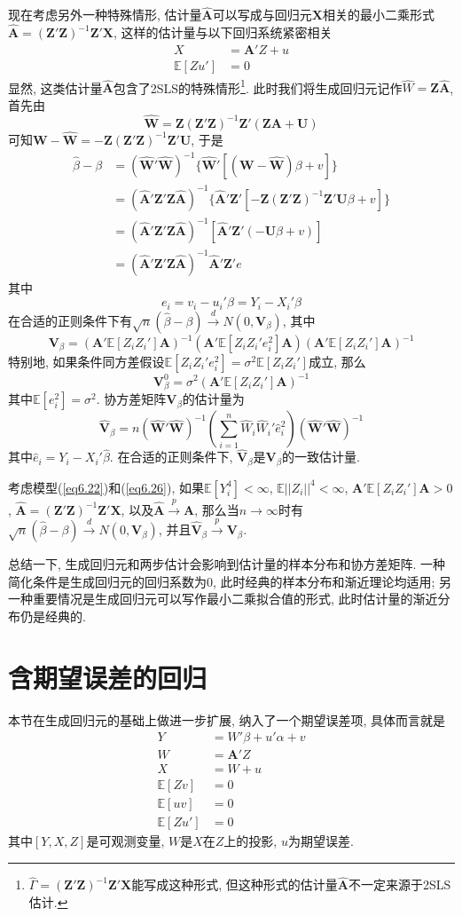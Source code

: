 \documentclass[cn, 12pt, math=mtpro2, bibstyle=apa, blue, twocol]{elegantbook}
\newcommand{\E}{\mathbb{E}}
\newcommand{\X}{\mathbold{X}}
\newcommand{\Z}{\mathbold{Z}}
\newcommand{\hb}{\hat{\beta}}
\newcommand{\V}{\mathbold{V}}
\newcommand{\A}{\mathbold{A}}
\begin{document}
现在考虑另外一种特殊情形, 估计量$\hat{\A}$可以写成与回归元$\X$相关的最小二乘形式$\hat{\A}=(\Z'\Z)^{-1}\Z'\X$, 这样的估计量与以下回归系统紧密相关
\begin{align}
  X&=\A'Z+u \label{eq6.26} \\
  \E[Zu']&=0 \nonumber
\end{align}
显然, 这类估计量$\hat{\A}$包含了2SLS的特殊情形\footnote{$\hat{\Gamma}=(\Z'\Z)^{-1}\Z'\X$能写成这种形式, 但这种形式的估计量$\hat{\A}$不一定来源于2SLS估计.}. 此时我们将生成回归元记作$\hat{W}=\Z\hat{\A}$, 首先由
$$\hat{\mathbold{W}}=\Z(\Z'\Z)^{-1}\Z'(\Z\A+\mathbold{U})$$
可知$\mathbold{W}-\hat{\mathbold{W}}=-\Z(\Z'\Z)^{-1}\Z'\mathbold{U}$, 于是
\begin{align*}
\hb-\beta&=(\hat{\mathbold{W}}'\hat{\mathbold{W}})^{-1}\{\hat{\mathbold{W}}'[(\mathbold{W}-\hat{\mathbold{W}})\beta+v]\} \\
&=(\hat{\A}'\Z'\Z\hat{\A})^{-1}\{\hat{\A}'\Z'[-\Z(\Z'\Z)^{-1}\Z'\mathbold{U}\beta+v]\} \\
&=(\hat{\A}'\Z'\Z\hat{\A})^{-1}[\hat{\A}'\Z'(-\mathbold{U}\beta+v)] \\
&=(\hat{\A}'\Z'\Z\hat{\A})^{-1}\hat{\A}'\Z'e
\end{align*}
其中
$$e_i=v_i-u_i'\beta=Y_i-X_i'\beta$$
在合适的正则条件下有$\sqrt{n}(\hb-\beta)\xrightarrow{d}N(0,\V_\beta)$, 其中
$$\V_\beta=(\A'\E[Z_iZ_i']\A)^{-1}(\A'\E[Z_iZ_i'e_i^2]\A)(\A'\E[Z_iZ_i']\A)^{-1}$$
特别地, 如果条件同方差假设$\E[Z_iZ_i'e_i^2]=\sigma^2\E[Z_iZ_i']$成立, 那么
$$\V_\beta^0=\sigma^2(\A'\E[Z_iZ_i']\A)^{-1}$$
其中$\E[e_i^2]=\sigma^2$. 协方差矩阵$\V_\beta$的估计量为
$$\hat{\V}_\beta=n(\hat{\mathbold{W}}'\hat{\mathbold{W}})^{-1}\left(\sum_{i=1}^{n}\hat{W}_i\hat{W}_i'\hat{e}_i^2\right)(\hat{\mathbold{W}}'\hat{\mathbold{W}})^{-1}$$
其中$\hat{e}_i=Y_i-X_i'\hb$. 在合适的正则条件下, $\hat{\V}_\beta$是$\V_\beta$的一致估计量.

\begin{theorem}
  考虑模型(\ref{eq6.22})和(\ref{eq6.26}), 如果$\E[Y_i^4]<\infty$, $\E||Z_i||^4<\infty$, $\A'\E[Z_iZ_i']\A>0$, $\hat{\A}=(\Z'\Z)^{-1}\Z'\X$, 以及$\hat{\A}\xrightarrow{p}\A$, 那么当$n\to\infty$时有
  $\sqrt{n}(\hb-\beta)\xrightarrow{d}N(0,\V_\beta)$, 并且$\hat{\V}_\beta\xrightarrow{p}\V_\beta$.
\end{theorem}
总结一下, 生成回归元和两步估计会影响到估计量的样本分布和协方差矩阵. 一种简化条件是生成回归元的回归系数为0, 此时经典的样本分布和渐近理论均适用; 另一种重要情况是生成回归元可以写作最小二乘拟合值的形式, 此时估计量的渐近分布仍是经典的.
\section{含期望误差的回归}
本节在生成回归元的基础上做进一步扩展, 纳入了一个期望误差项, 具体而言就是
\begin{align}
Y&=W'\beta+u'\alpha+v \label{eq6.30} \\
W&=\mathbold{A}'Z \nonumber \\
X&=W+u \nonumber \\
\E[Zv]&=0 \nonumber \\
\E[uv]&=0 \nonumber \\
\E[Zu']&=0 \nonumber
\end{align}
其中$[Y,X,Z]$是可观测变量, $W$是$X$在$Z$上的投影, $u$为期望误差.
\end{document}

